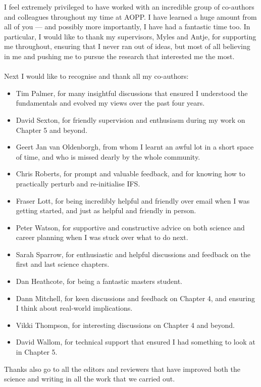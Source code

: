 I feel extremely privileged to have worked with an incredible group of co-authors and colleagues throughout my time at AOPP. I have learned a huge amount from all of you --- and possibly more importantly, I have had a fantastic time too. In particular, I would like to thank my supervisors, Myles and Antje, for supporting me throughout, ensuring that I never ran out of ideas, but most of all believing in me and pushing me to pursue the research that interested me the most.\\\\
\noindent Next I would like to recognise and thank all my co-authors:
\begin{itemize}[label={},leftmargin=*]
    \itemsep0em
    \item Tim Palmer, for many insightful discussions that ensured I understood the fundamentals and evolved my views over the past four years.
    \item David Sexton, for friendly supervision and enthusiasm during my work on Chapter 5 and beyond.
    \item Geert Jan van Oldenborgh, from whom I learnt an awful lot in a short space of time, and who is missed dearly by the whole community.
    \item Chris Roberts, for prompt and valuable feedback, and for knowing how to practically perturb and re-initialise IFS.
    \item Fraser Lott, for being incredibly helpful and friendly over email when I was getting started, and just as helpful and friendly in person.
    \item Peter Watson, for supportive and constructive advice on both science and career planning when I was stuck over what to do next.
    \item Sarah Sparrow, for enthusiastic and helpful discussions and feedback on the first and last science chapters.
    \item Dan Heathcote, for being a fantastic masters student.
    \item Dann Mitchell, for keen discussions and feedback on Chapter 4, and ensuring I think about real-world implications.
    \item Vikki Thompson, for interesting discussions on Chapter 4 and beyond.
    \item David Wallom, for technical support that ensured I had something to look at in Chapter 5.
\end{itemize}
Thanks also go to all the editors and reviewers that have improved both the science and writing in all the work that we carried out.\\\\
